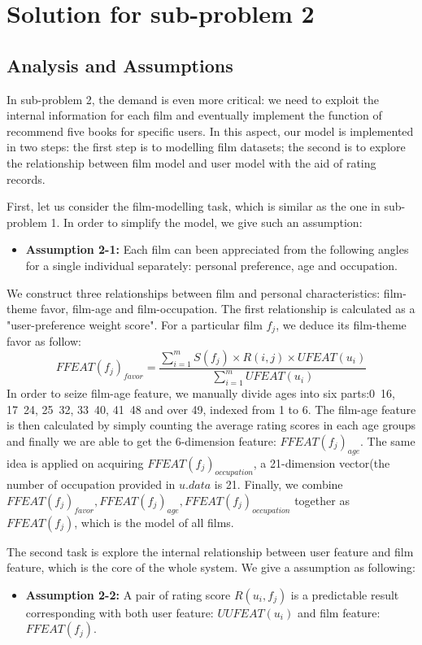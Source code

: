 \section{Solution for sub-problem 2}
\subsection{Analysis and Assumptions}
In sub-problem 2, the demand is even more critical: we need to exploit the internal information for each film and eventually implement the function of recommend five books for specific users. In this aspect, our model is implemented in two steps: the first step is to modelling film datasets; the second is to explore the relationship between film model and user model with the aid of rating records.

First, let us consider the film-modelling task, which is similar as the one in sub-problem 1. In order to simplify the model, we give such an assumption:

\begin{itemize}
\item \textbf{Assumption 2-1:} Each film can been appreciated from the following angles for a single individual separately: personal preference, age and occupation.
\end{itemize} 


We construct three relationships between film and personal characteristics: film-theme favor, film-age and film-occupation. The first relationship is calculated as a "user-preference weight score".
For a particular film $f_{j}$, we deduce its film-theme favor as follow:
\begin{equation}
FFEAT(f_{j})_{favor}=\dfrac {\sum ^{m}_{i=1}S\left( f_{j}\right) \times R\left( i,j\right) \times UFEAT\left( u_{i}\right) }{\sum ^{m}_{i=1}UFEAT\left( u_{i}\right) }
\end{equation}
In order to seize film-age feature, we manually divide ages into six parts:0~16, 17~24, 25~32, 33~40, 41~48 and over 49, indexed from 1 to 6. The film-age feature is then calculated by simply counting the average rating scores in each age groups and finally we are able to get the 6-dimension feature: $FFEAT(f_{j})_{age}$. The same idea is applied on acquiring $FFEAT(f_{j})_{occupation}$, a 21-dimension vector(the number of occupation provided in $u.data$ is 21. Finally, we combine $FFEAT(f_{j})_{favor}, FFEAT(f_{j})_{age}, FFEAT(f_{j})_{occupation}$ together as $FFEAT(f_{j})$, which is the model of all films. 

The second task is explore the internal relationship between user feature and film feature, which is the core of the whole system. We give a assumption as following:
\begin{itemize}
\item \textbf{Assumption 2-2:} A pair of rating score $R(u_{i},f_{j})$ is a predictable result corresponding with both user feature: $UUFEAT(u_{i})$ and film feature: $FFEAT(f_{j})$. 
\end{itemize} 

